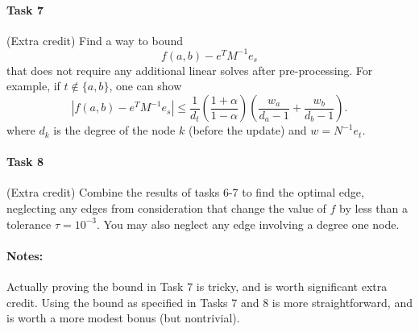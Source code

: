 \documentclass[12pt, leqno]{article}
\begin{document}
\paragraph*{Task 7} (Extra credit)
Find a way to bound
\[
  f(a,b) - e^T M^{-1} e_s
\]
that does not require any additional linear solves after
pre-processing.  For example, if $t \not \in \{a, b\}$,
one can show
\[
|f(a,b) - e^T M^{-1} e_s| \leq
\frac{1}{d_t}
\left( \frac{1+\alpha}{1-\alpha} \right)
\left( \frac{w_a}{d_a-1} + \frac{w_b}{d_b-1} \right).
\]
where $d_k$ is the degree of the node $k$ (before the update)
and $w = N^{-1} e_t$.

\paragraph*{Task 8} (Extra credit)
Combine the results of tasks 6-7 to find the optimal edge, neglecting
any edges from consideration that change the value of $f$ by less than
a tolerance $\tau = 10^{-3}$.  You may also neglect any edge involving
a degree one node.

\paragraph*{Notes:}
Actually proving the bound in Task 7 is tricky, and is worth
significant extra credit.  Using the bound as specified in Tasks 7 and
8 is more straightforward, and is worth a more modest bonus (but nontrivial).
\end{document}
